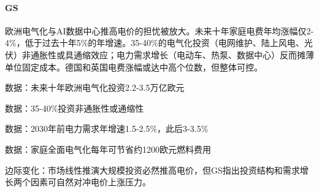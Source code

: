 \documentclass[11pt]{ctexart}
\begin{document}
\paragraph{GS} 欧洲电气化与AI数据中心推高电价的担忧被放大。未来十年家庭电费年均涨幅仅2-4\%，低于过去十年5\%的年增速。35-40\%的电气化投资（电网维护、陆上风电、光伏）非通胀性或具通缩效应；电力需求增长（电动车、热泵、数据中心）反而摊薄单位固定成本。德国和英国电费涨幅或达中高个位数，但整体可控。
{\small\color{refgray}数据：未来十年欧洲电气化投资2.2-3.5万亿欧元\par}
{\small\color{refgray}数据：35-40\%投资非通胀性或通缩性\par}
{\small\color{refgray}数据：2030年前电力需求年增速1.5-2.5\%，此后3-3.5\%\par}
{\small\color{refgray}数据：家庭全面电气化每年可节省约1200欧元燃料费用\par}
{\small\color{refgray}边际变化：市场线性推演大规模投资必然推高电价，但GS指出投资结构和需求增长两个因素可自然对冲电价上涨压力。\par}
\end{document}
